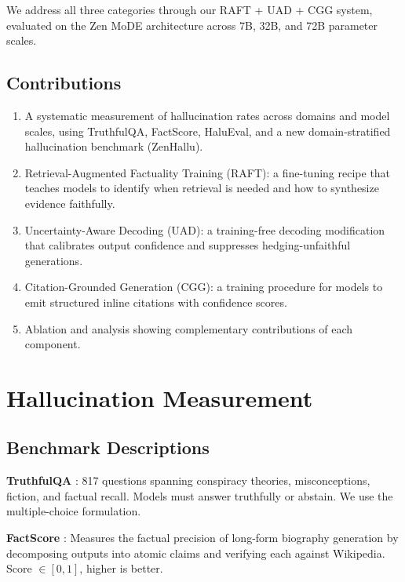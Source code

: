 \documentclass[11pt,a4paper]{article}
\begin{document}
We address all three categories through our RAFT + UAD + CGG system, evaluated on the
Zen MoDE architecture across 7B, 32B, and 72B parameter scales.

\subsection{Contributions}

\begin{enumerate}
    \item A systematic measurement of hallucination rates across domains and model scales,
          using TruthfulQA, FactScore, HaluEval, and a new domain-stratified hallucination
          benchmark (ZenHallu).
    \item Retrieval-Augmented Factuality Training (RAFT): a fine-tuning recipe that
          teaches models to identify when retrieval is needed and how to synthesize
          evidence faithfully.
    \item Uncertainty-Aware Decoding (UAD): a training-free decoding modification that
          calibrates output confidence and suppresses hedging-unfaithful generations.
    \item Citation-Grounded Generation (CGG): a training procedure for models to emit
          structured inline citations with confidence scores.
    \item Ablation and analysis showing complementary contributions of each component.
\end{enumerate}

\section{Hallucination Measurement}
\label{sec:measurement}

\subsection{Benchmark Descriptions}

\textbf{TruthfulQA} \cite{lin2021truthfulqa}: 817 questions spanning conspiracy theories,
misconceptions, fiction, and factual recall. Models must answer truthfully or abstain.
We use the multiple-choice formulation.

\textbf{FactScore} \cite{min2023factscore}: Measures the factual precision of long-form
biography generation by decomposing outputs into atomic claims and verifying each against
Wikipedia. Score $\in [0, 1]$, higher is better.
\end{document}
